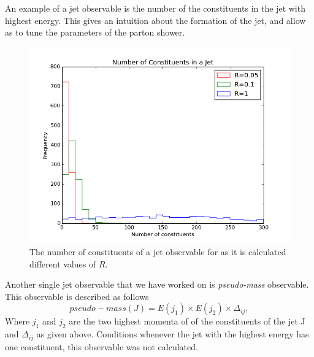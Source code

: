 An example of a jet observable is the number of the constituents in the jet with highest energy.  This gives an intuition about the formation of the jet, and allow as to tune the parameters of the parton shower.
\begin{figure}[hbtp]
\centering
\includegraphics[scale=.8]{images/n_of_con_obs.png}
\caption{The number of constituents of a jet observable for as it is calculated different  values of $R$.  
}\label{nofcon}
\end{figure}


Another single jet observable that we have worked on is \textit{pseudo-mass} observable. This observable is described as follows \begin{equation}
pseudo-mass(J) = E(j_1) \times E(j_2) \times \Delta_{ij} ,
\end{equation}   Where $j_1$ and $j_2$ are the two highest  momenta of of the constituents of the jet J and $\Delta_{ij}$ as given above.
Conditions whenever
the jet with the highest energy has one constituent, this observable was not calculated.


